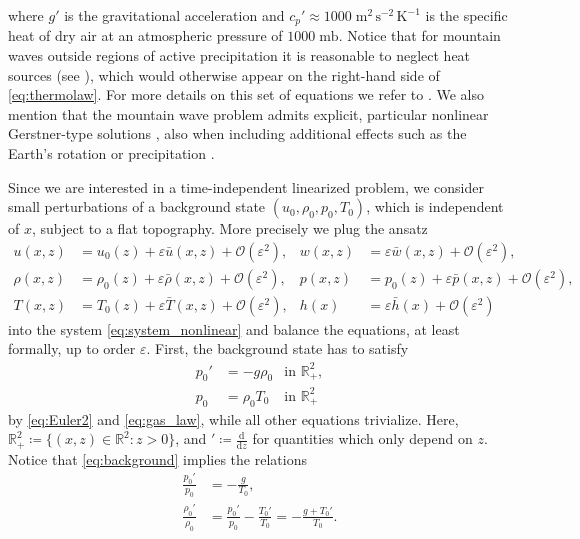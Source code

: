 \documentclass[11pt,twoside,reqno,centertags]{amsart}
\theoremstyle{definition}
\newcommand{\R}{\mathbb R}
\newcommand{\dd}{\mathrm d}
\begin{document}
where $g'$ is the gravitational acceleration and $c_p'\approx 1000\;\mathrm{m^2\,s^{-2}\,K^{-1}}$ is the specific heat of dry air at an atmospheric pressure of $1000\;\mathrm{mb}$. Notice that for mountain waves 
outside regions of active precipitation it is reasonable to neglect heat sources (see \cite{Constantin23}), which would otherwise appear on the right-hand side of \eqref{eq:thermolaw}. For more details on this set of equations we refer to \cite{Constantin23,Smith79}. We also mention that the mountain wave problem admits explicit, particular nonlinear Gerstner-type solutions \cite{Constantin23}, also when including additional effects such as the Earth's rotation \cite{Henry24} or precipitation \cite{Lyons25,LyonsMcCarney25}.

Since we are interested in a time-independent linearized problem, we consider small perturbations of a background state $(u_0,\rho_0,p_0,T_0)$, which is independent of $x$, subject to a flat topography. More precisely we plug the ansatz
\begin{align*}
	u(x,z) &= u_0(z) + \varepsilon \bar u(x,z) + \mathcal O(\varepsilon^2),& w(x,z) &= \varepsilon \bar w(x,z) + \mathcal O(\varepsilon^2),\\
	\rho(x,z) &= \rho_0(z) + \varepsilon \bar \rho(x,z) + \mathcal O(\varepsilon^2),&
	p(x,z) &= p_0(z) + \varepsilon \bar p(x,z) + \mathcal O(\varepsilon^2),\\
	T(x,z) &= T_0(z) + \varepsilon \bar T(x,z) + \mathcal O(\varepsilon^2),& h(x) &= \varepsilon \bar h(x) + \mathcal O(\varepsilon^2)
\end{align*}
into the system \eqref{eq:system_nonlinear} and balance the equations, at least formally, up to order $\varepsilon$. First, the background state has to satisfy
\begin{subequations}\label{eq:background}
	\begin{align}
		p_0' &= -g\rho_0 & \text{in }\R^2_+,\\
		p_0 &= \rho_0 T_0 & \text{in }\R^2_+
	\end{align}
\end{subequations}
by \eqref{eq:Euler2} and \eqref{eq:gas_law}, while all other equations trivialize. Here, $\R^2_+\coloneqq\{(x,z)\in\R^2:z>0\}$, and $'\coloneqq\frac{\dd}{\dd z}$ for quantities which only depend on $z$. Notice that \eqref{eq:background} implies the relations
\begin{subequations}\label{eq:background_otherrelations}
	\begin{align}
		\frac{p_0'}{p_0} &= -\frac{g}{T_0},\\
		\frac{\rho_0'}{\rho_0} &= \frac{p_0'}{p_0}-\frac{T_0'}{T_0} = -\frac{g+T_0'}{T_0}.
	\end{align}
\end{subequations}
\end{document}
